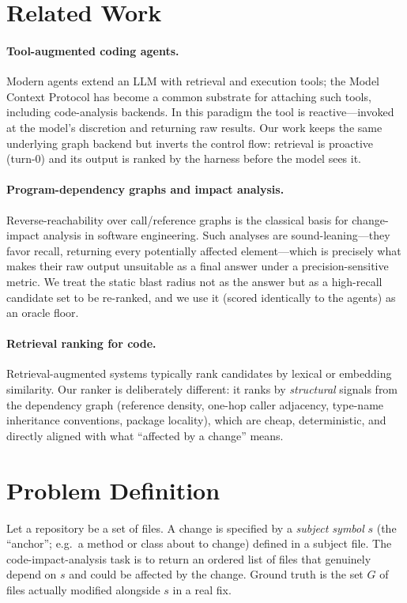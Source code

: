\documentclass[11pt,twocolumn]{article}
\begin{document}
\section{Related Work}

\paragraph{Tool-augmented coding agents.} Modern agents extend an LLM with retrieval and
execution tools; the Model Context Protocol has become a common substrate for attaching such
tools, including code-analysis backends. In this paradigm the tool is reactive---invoked at the
model's discretion and returning raw results. Our work keeps the same underlying graph backend
but inverts the control flow: retrieval is proactive (turn-0) and its output is ranked by the
harness before the model sees it.

\paragraph{Program-dependency graphs and impact analysis.} Reverse-reachability over
call/reference graphs is the classical basis for change-impact analysis in software
engineering. Such analyses are sound-leaning---they favor recall, returning every potentially
affected element---which is precisely what makes their raw output unsuitable as a final answer
under a precision-sensitive metric. We treat the static blast radius not as the answer but as a
high-recall candidate set to be re-ranked, and we use it (scored identically to the agents) as
an oracle floor.

\paragraph{Retrieval ranking for code.} Retrieval-augmented systems typically rank candidates by
lexical or embedding similarity. Our ranker is deliberately different: it ranks by
\emph{structural} signals from the dependency graph (reference density, one-hop caller adjacency,
type-name inheritance conventions, package locality), which are cheap, deterministic, and
directly aligned with what ``affected by a change'' means.

\section{Problem Definition}\label{sec:problem}

Let a repository be a set of files. A change is specified by a \emph{subject symbol} $s$ (the
``anchor''; e.g.\ a method or class about to change) defined in a subject file. The
code-impact-analysis task is to return an ordered list of files that genuinely depend on $s$ and
could be affected by the change. Ground truth is the set $G$ of files actually modified
alongside $s$ in a real fix.
\end{document}
